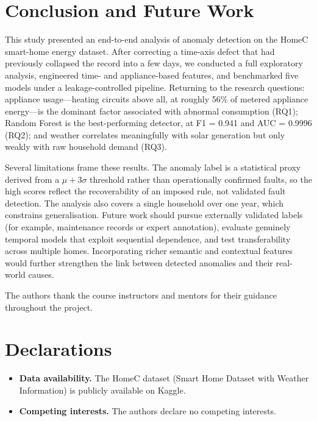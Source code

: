 \documentclass[pdflatex,sn-mathphys-num]{sn-jnl}%
\theoremstyle{thmstyleone}%
\theoremstyle{thmstyletwo}%
\theoremstyle{thmstylethree}%
\begin{document}
\section{Conclusion and Future Work}\label{sec:conclusion}

This study presented an end-to-end analysis of anomaly detection on the HomeC smart-home energy dataset. After correcting a time-axis defect that had previously collapsed the record into a few days, we conducted a full exploratory analysis, engineered time- and appliance-based features, and benchmarked five models under a leakage-controlled pipeline. Returning to the research questions: appliance usage---heating circuits above all, at roughly 56\% of metered appliance energy---is the dominant factor associated with abnormal consumption (RQ1); Random Forest is the best-performing detector, at F1 = 0.941 and AUC = 0.9996 (RQ2); and weather correlates meaningfully with solar generation but only weakly with raw household demand (RQ3).

Several limitations frame these results. The anomaly label is a statistical proxy derived from a $\mu + 3\sigma$ threshold rather than operationally confirmed faults, so the high scores reflect the recoverability of an imposed rule, not validated fault detection. The analysis also covers a single household over one year, which constrains generalisation. Future work should pursue externally validated labels (for example, maintenance records or expert annotation), evaluate genuinely temporal models that exploit sequential dependence, and test transferability across multiple homes. Incorporating richer semantic and contextual features would further strengthen the link between detected anomalies and their real-world causes.

\backmatter

The authors thank the course instructors and mentors for their guidance throughout the project.

\section*{Declarations}
\begin{itemize}
\item \textbf{Data availability.} The HomeC dataset (Smart Home Dataset with Weather Information) is publicly available on Kaggle.
\item \textbf{Competing interests.} The authors declare no competing interests.
\end{itemize}
\end{document}
